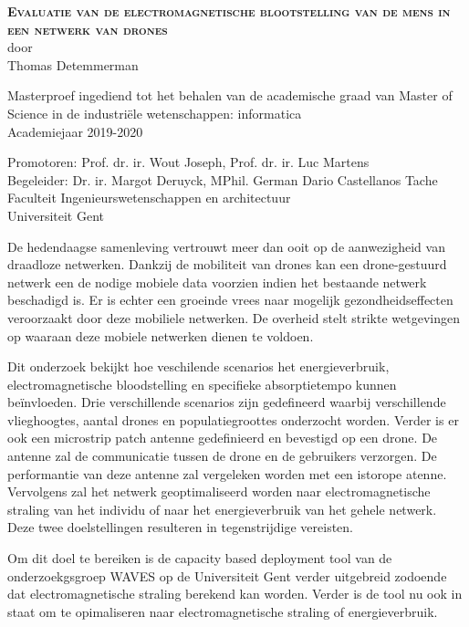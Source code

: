 \begin{center}
\textsc{\textbf{\Huge Evaluatie van de electromagnetische blootstelling van de mens in een netwerk van drones}}\\

door\\
Thomas Detemmerman

Masterproef ingediend tot het behalen van de academische graad van Master of Science in de
industri\"ele wetenschappen: informatica\\
Academiejaar 2019-2020

Promotoren: Prof. dr. ir. Wout Joseph, Prof. dr. ir. Luc Martens\\
Begeleider: Dr. ir. Margot Deruyck, MPhil. German Dario Castellanos Tache\\
Faculteit Ingenieurswetenschappen en architectuur\\
Universiteit Gent
\end{center}

De hedendaagse samenleving vertrouwt meer dan ooit op de aanwezigheid van draadloze netwerken. 
Dankzij de mobiliteit van  drones kan een drone-gestuurd netwerk een de nodige mobiele data voorzien 
indien het bestaande netwerk beschadigd is.
Er is echter een groeinde vrees naar mogelijk gezondheidseffecten veroorzaakt door deze
mobiliele netwerken. De overheid stelt strikte wetgevingen op waaraan deze mobiele netwerken dienen te voldoen.

Dit onderzoek bekijkt hoe veschilende scenarios het energieverbruik, electromagnetische bloodstelling en 
specifieke absorptietempo kunnen be\"invloeden.
Drie verschillende scenarios zijn gedefineerd waarbij verschillende vlieghoogtes, aantal drones en 
populatiegroottes onderzocht worden.
Verder is er ook een microstrip patch antenne gedefinieerd en bevestigd op een drone. 
De antenne zal de communicatie tussen de drone en de gebruikers verzorgen.
De performantie van deze antenne zal vergeleken worden met een istorope atenne.
Vervolgens zal het netwerk geoptimaliseerd worden naar electromagnetische straling van het individu of 
naar het energieverbruik van het gehele netwerk. Deze twee doelstellingen resulteren in 
tegenstrijdige vereisten. 

Om dit doel te bereiken is de capacity based deployment tool van de onderzoekgsgroep WAVES op de 
Universiteit Gent verder uitgebreid zodoende dat electromagnetische straling berekend kan worden.
Verder is de tool nu ook in staat om te opimaliseren naar electromagnetische straling of energieverbruik. 

